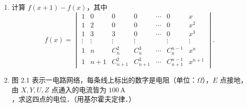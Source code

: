 \begin{enumerate}
\begin{enumerate}
\[    \]
  \anssub
    \item \[
    \begin{vmatrix}
      x&y&y&\cdots&y&y\\
      z&x&y&\cdots&y&y\\
      z&z&x&\cdots&y&y\\
      \vdots&\vdots&\vdots&&\vdots&\vdots\\
      z&z&z&\cdots&z&x
    \end{vmatrix};
    \]
  \anssub
    \item \[
    \begin{vmatrix}
      1&1&\cdots&1\\
      x_1&x_2&\cdots&x_n\\
      x_1^2&x_2^2&\cdots&x_n^2\\
      \vdots&\vdots&&\vdots\\
      x_1^{n-2}&x_2^{n-2}&\cdots&x_n^{n-2}\\
      x_1^n&x_2^n&\cdots&x_n^n
    \end{vmatrix}.
    \]
  \anssub
  \end{enumerate}
  \item 计算 $f(x+1)-f(x)$，其中
  \[
    f(x)=
    \begin{vmatrix}
      1&0&0&0&\cdots&0&x\\
      1&2&0&0&\cdots&0&x^2\\
      1&3&3&0&\cdots&0&x^3\\
      \vdots&\vdots&\vdots&\vdots&&\vdots&\vdots\\
      1&n&C_n^2&C_n^3&\cdots&C_n^{n-1}&x^n\\
      1&n+1&C_{n+1}^2&C_{n+1}^3&\cdots&C_{n+1}^{n-1}&x^{n+1}
    \end{vmatrix}.
  \]
  \anscompute
  \item 图 2.1 表示一电路网络，每条线上标出的数字是电阻（单位：$\Omega$），$E$ 点接地，由 $X,Y,U,Z$ 点通入的电流皆为 $100\,\mathrm{A}$，求这四点的电位．（用基尔霍夫定律．）


\end{enumerate}
